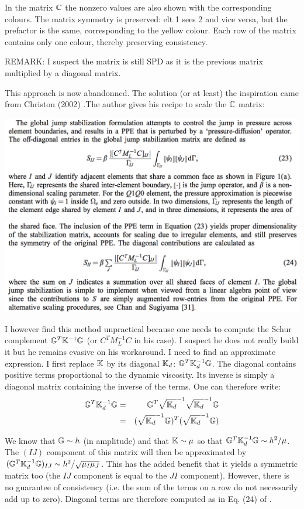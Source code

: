 In the matrix ${\mathbb{C}}$ the nonzero values are also shown with the corresponding colours.
The matrix symmetry is preserved: elt 1 sees 2 and vice versa, but the prefactor is the same, corresponding
to the yellow colour. Each row of the matrix contains only one colour, thereby preserving consistency.
 
REMARK: I suspect the matrix is still SPD as it is the previous matrix multiplied by a diagonal matrix.



This approach is now abandonned. The solution (or at least) the inspiration came from Christon (2002) \cite{chri02}.The author gives his recipe to scale the ${\mathbb{C}}$ matrix:

\begin{center}
\includegraphics[width=15cm]{images/q1p0stab/chri_a.png}\\
\includegraphics[width=15cm]{images/q1p0stab/chri_b.png}
\end{center}

I however find this method unpractical because one needs to compute the
Schur complement ${\mathbb{G}}^T {\mathbb{K}}^{-1} {\mathbb{G}}$ (or $C^T M_L^{-1} C$ in his case).
I suspect he does not really build it but he remains evasive on his 
workaround. 
I need to find an approximate expression. I first replace ${\mathbb{K}}$ by
its diagonal ${\mathbb{K}}_d$: ${\mathbb{G}}^T {\mathbb{K}}_d^{-1} {\mathbb{G}}$. The diagonal contains 
positive terms proportional to the dynamic viscosity. Its inverse 
is simply a diagonal matrix containing the inverse of the terms.
One can therefore write: 
\begin{eqnarray}
{\mathbb{G}}^T {\mathbb{K}}_d^{-1} {\mathbb{G}} 
&=& {\mathbb{G}}^T \sqrt{{\mathbb{K}}_d}^{-1} \sqrt{{\mathbb{K}}_d}^{-1} {\mathbb{G}}  \nonumber\\
&=& ( \sqrt{{\mathbb{K}}_d}^{-1} {\mathbb{G}})^T (\sqrt{{\mathbb{K}}_d}^{-1} {\mathbb{G}})  \nonumber\\
\end{eqnarray}

We know that ${\mathbb{G}} \sim h$ (in amplitude) and that ${\mathbb{K}} \sim \mu$ so that
$ {\mathbb{G}}^T {\mathbb{K}}_d^{-1} {\mathbb{G}} \sim h^2/\mu$. 
The $(IJ)$ component of this matrix will then be approximated by
$({\mathbb{G}}^T {\mathbb{K}}_d^{-1} {\mathbb{G}})_{IJ} \sim  h^2/\sqrt{\mu_I \mu_J} $. 
This has the added benefit that it yields a symmetric matrix too
(the $IJ$ component is equal to the $JI$ component).
However, there is no guarantee of consistency (i.e. the sum of the
terms on a row do not necessarily add up to zero). 
Diagonal terms are therefore computed as in Eq. (24) of \cite{chri02}.


